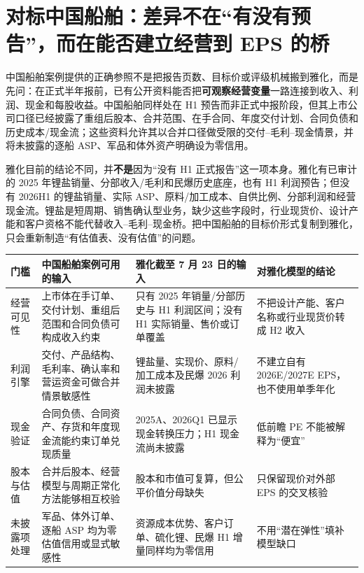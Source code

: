 \section{对标中国船舶：差异不在“有没有预告”，而在能否建立经营到 EPS 的桥}

中国船舶案例提供的正确参照不是把报告页数、目标价或评级机械搬到雅化，而是先问：在正式半年报前，已有公开资料能否把\textbf{可观察经营变量}一路连接到收入、利润、现金和每股收益。中国船舶同样处在 H1 预告而非正式中报阶段，但其上市公司口径已经披露了重组后股本、合并范围、在手合同、年度交付计划、合同负债和历史成本/现金流；这些资料允许其以合并口径做受限的交付--毛利--现金情景，并将未披露的逐船 ASP、军品和体外资产明确设为零信用。

雅化目前的结论不同，并\textbf{不是}因为“没有 H1 正式报告”这一项本身。雅化有已审计的 2025 年锂盐销量、分部收入/毛利和民爆历史底座，也有 H1 利润预告；但没有 2026H1 的锂盐销量、实际 ASP、原料/加工成本、自供比例、分部利润和经营现金流。锂盐是短周期、销售确认型业务，缺少这些字段时，行业现货价、设计产能和客户资格不能代替收入--毛利--现金桥。把中国船舶的目标价形式复制到雅化，只会重新制造“有估值表、没有估值”的问题。

\begin{exhibitbox}
\begin{tabularx}{\exhibitboxwidth}{L{2.6cm}X X X}
\toprule
门槛 & 中国船舶案例可用的输入 & 雅化截至 7 月 23 日的输入 & 对雅化模型的结论 \\
\midrule
经营可见性 & 上市体在手订单、交付计划、重组后范围和合同负债可构成收入约束 & 只有 2025 年销量/分部历史与 H1 利润区间；没有 H1 实际销量、售价或订单覆盖 & 不把设计产能、客户名称或行业现货价转成 H2 收入 \\
利润引擎 & 交付、产品结构、毛利率、确认率和营运资金可做合并情景敏感性 & 锂盐量、实现价、原料/加工成本及民爆 2026 利润未披露 & 不建立自有 2026E/2027E EPS，也不使用单季年化 \\
现金验证 & 合同负债、合同资产、存货和年度现金流能约束订单兑现质量 & 2025A、2026Q1 已显示现金转换压力；H1 现金流尚未披露 & 低前瞻 PE 不能被解释为“便宜” \\
股本与估值 & 合并后股本、经营模型与周期正常化方法能够相互校验 & 股本和市值可复算，但公平价值分母缺失 & 只保留现价对外部 EPS 的交叉核验 \\
未披露项处理 & 军品、体外订单、逐船 ASP 均为零估值信用或显式敏感性 & 资源成本优势、客户订单、硫化锂、民爆 H1 增量同样均为零信用 & 不用“潜在弹性”填补模型缺口 \\
\bottomrule
\end{tabularx}
\end{exhibitbox}

